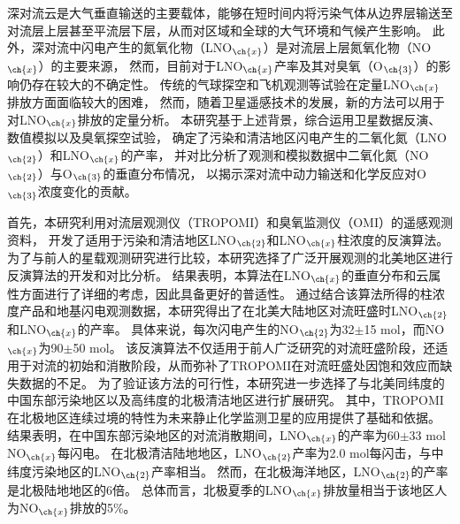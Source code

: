 
\abstract
{
深对流云是大气垂直输送的主要载体，能够在短时间内将污染气体从边界层输送至对流层上层甚至平流层下层，从而对区域和全球的大气环境和气候产生影响。
此外，深对流中闪电产生的氮氧化物（LNO$_{\ch{x}}$）是对流层上层氮氧化物（NO$_{\ch{x}}$）的主要来源，
然而，目前对于LNO$_{\ch{x}}$产率及其对臭氧（O$_{\ch{3}}$）的影响仍存在较大的不确定性。
传统的气球探空和飞机观测等试验在定量LNO$_{\ch{x}}$排放方面面临较大的困难，
然而，随着卫星遥感技术的发展，新的方法可以用于对LNO$_{\ch{x}}$排放的定量分析。
本研究基于上述背景，综合运用卫星数据反演、数值模拟以及臭氧探空试验，
确定了污染和清洁地区闪电产生的二氧化氮（LNO$_{\ch{2}}$）和LNO$_{\ch{x}}$的产率，
并对比分析了观测和模拟数据中二氧化氮（NO$_{\ch{2}}$）与O$_{\ch{3}}$的垂直分布情况，
以揭示深对流中动力输送和化学反应对O$_{\ch{3}}$浓度变化的贡献。

首先，本研究利用对流层观测仪（TROPOMI）和臭氧监测仪（OMI）的遥感观测资料，
开发了适用于污染和清洁地区LNO$_{\ch{2}}$和LNO$_{\ch{x}}$柱浓度的反演算法。
为了与前人的星载观测研究进行比较，本研究选择了广泛开展观测的北美地区进行反演算法的开发和对比分析。
结果表明，本算法在LNO$_{\ch{x}}$的垂直分布和云属性方面进行了详细的考虑，因此具备更好的普适性。
通过结合该算法所得的柱浓度产品和地基闪电观测数据，本研究得出了在北美大陆地区对流旺盛时LNO$_{\ch{2}}$和LNO$_{\ch{x}}$的产率。
具体来说，每次闪电产生的NO$_{\ch{2}}$为32$\pm$15 mol，而NO$_{\ch{x}}$为90$\pm$50 mol。
该反演算法不仅适用于前人广泛研究的对流旺盛阶段，还适用于对流的初始和消散阶段，从而弥补了TROPOMI在对流旺盛处因饱和效应而缺失数据的不足。
为了验证该方法的可行性，本研究进一步选择了与北美同纬度的中国东部污染地区以及高纬度的北极清洁地区进行扩展研究。
其中，TROPOMI在北极地区连续过境的特性为未来静止化学监测卫星的应用提供了基础和依据。
结果表明，在中国东部污染地区的对流消散期间，LNO$_{\ch{x}}$的产率为60$\pm$33 mol NO$_{\ch{x}}$每闪电。
在北极清洁陆地地区，LNO$_{\ch{2}}$产率为2.0 mol每闪击，与中纬度污染地区的LNO$_{\ch{2}}$产率相当。
然而，在北极海洋地区，LNO$_{\ch{2}}$的产率是北极陆地地区的6倍。
总体而言，北极夏季的LNO$_{\ch{x}}$排放量相当于该地区人为NO$_{\ch{x}}$排放的5\%。

}
